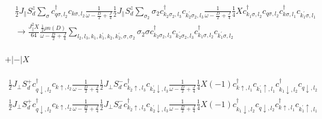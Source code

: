 \documentclass[12pt]{revtex4-2}
\begin{document}
\begin{equation}\begin{aligned}
	&\frac{1}{2}J_\parallel S_d^z \sum_\sigma c^\dagger_{q \sigma, l_2}c_{k \sigma, l_2}\frac{1}{\omega - \frac{D}{2} + \frac{J}{4}}\frac{1}{2}J_\parallel S_d^z \sum_{\sigma_2} \sigma_2 c^\dagger_{k_2 \sigma_2, l_3}c_{k_2^\prime \sigma_2, l_3} \frac{1}{\omega - \frac{D}{2} + \frac{J}{4}} \frac{1}{4}X c^\dagger_{k_1\sigma,l_2}c_{q\sigma,l_2} c^\dagger_{k\sigma,l_1}c_{k_1^\prime\sigma,l_1}\\
	&\longrightarrow \frac{J_\parallel^2 X}{64} \frac{\frac{1}{2}\rho n(D)}{\omega - \frac{D}{2} + \frac{J}{4}}\sum_{l_2, l_3, k_1,k_1^\prime,k_2,k_2^\prime,\sigma,\sigma_2} \sigma_2 \sigma c^\dagger_{k_2 \sigma_2, l_3}c_{k_2^\prime \sigma_2, l_3} c^\dagger_{k_1\sigma,l_2}c_{k_1^\prime\sigma,l_2}
\end{aligned}\end{equation}

\paragraph{\(+|-|X\)}
\begin{equation}\begin{aligned}
	\frac{1}{2}J_\perp S_d^+ c^\dagger_{q \downarrow, l_2}c_{k \uparrow, l_2} \frac{1}{\omega - \frac{D}{2} + \frac{J}{4}}\frac{1}{2}J_\perp S_d^- c^\dagger_{k_2 \uparrow, l_3}c_{k_2^\prime \downarrow, l_3} \frac{1}{\omega - \frac{D}{2} + \frac{J}{4}} \frac{1}{4}X \left( -1 \right) c^\dagger_{k\uparrow,l_1}c_{k_1^\prime\uparrow,l_1}c^\dagger_{k_1 \downarrow,l_2}c_{q \downarrow,l_2} 
\end{aligned}\end{equation}
\begin{equation}\begin{aligned}
	\frac{1}{2}J_\perp S_d^+ c^\dagger_{q \downarrow, l_2}c_{k \uparrow, l_2} \frac{1}{\omega - \frac{D}{2} + \frac{J}{4}}\frac{1}{2}J_\perp S_d^- c^\dagger_{k_2 \uparrow, l_3}c_{k_2^\prime \downarrow, l_3} \frac{1}{\omega - \frac{D}{2} + \frac{J}{4}} \frac{1}{4}X \left( -1 \right) c^\dagger_{k_1 \downarrow,l_2}c_{q \downarrow,l_2} c^\dagger_{k\uparrow,l_1}c_{k_1^\prime\uparrow,l_1} 
\end{aligned}\end{equation}
\end{document}
